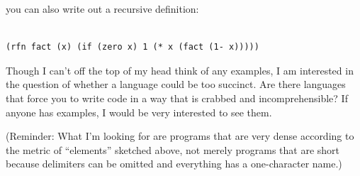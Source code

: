 you can also write out a recursive definition:

\begin{verbatim}

(rfn fact (x) (if (zero x) 1 (* x (fact (1- x)))))
\end{verbatim}

Though I can't off the top of my head think of any examples, I am
interested in the question of whether a language could be too succinct.
Are there languages that force you to write code in a way that is
crabbed and incomprehensible? If anyone has examples, I would be very
interested to see them.

(Reminder: What I'm looking for are programs that are very dense
according to the metric of ``elements'' sketched above, not merely
programs that are short because delimiters can be omitted and everything
has a one-character name.)